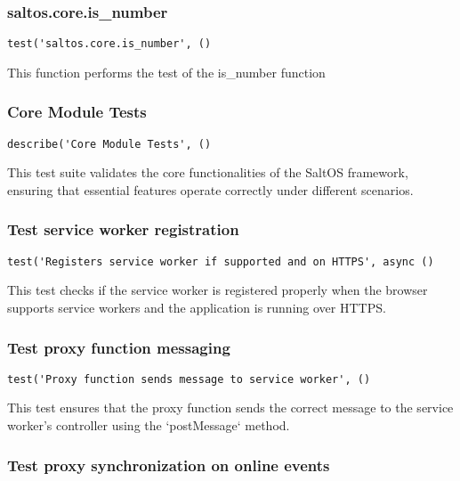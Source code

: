 \documentclass[a4paper]{article}
\begin{document}
\subsubsection{saltos.core.is\_number}

\begin{lstlisting}
test('saltos.core.is_number', ()
\end{lstlisting}

This function performs the test of the is\_number function

\hypertarget{toc102}{}
\subsubsection{Core Module Tests}

\begin{lstlisting}
describe('Core Module Tests', ()
\end{lstlisting}

This test suite validates the core functionalities of the SaltOS framework,
ensuring that essential features operate correctly under different scenarios.

\hypertarget{toc103}{}
\subsubsection{Test service worker registration}

\begin{lstlisting}
test('Registers service worker if supported and on HTTPS', async ()
\end{lstlisting}

This test checks if the service worker is registered properly when the
browser supports service workers and the application is running over HTTPS.

\hypertarget{toc104}{}
\subsubsection{Test proxy function messaging}

\begin{lstlisting}
test('Proxy function sends message to service worker', ()
\end{lstlisting}

This test ensures that the proxy function sends the correct message
to the service worker's controller using the `postMessage` method.

\hypertarget{toc105}{}
\subsubsection{Test proxy synchronization on online events}
\end{document}
